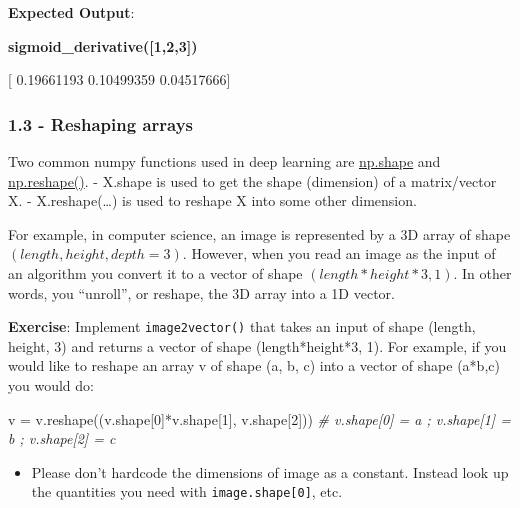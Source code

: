 \documentclass[11pt]{article}
\newenvironment{Shaded}{}{}
\newcommand{\DecValTok}[1]{\textcolor[rgb]{0.25,0.63,0.44}{{#1}}}
\newcommand{\CommentTok}[1]{\textcolor[rgb]{0.38,0.63,0.69}{\textit{{#1}}}}
\newcommand{\NormalTok}[1]{{#1}}
\begin{document}
    \textbf{Expected Output}:

\textbf{sigmoid\_derivative({[}1,2,3{]})}

{[} 0.19661193 0.10499359 0.04517666{]}

    \subsubsection{1.3 - Reshaping arrays}\label{reshaping-arrays}

Two common numpy functions used in deep learning are
\href{https://docs.scipy.org/doc/numpy/reference/generated/numpy.ndarray.shape.html}{np.shape}
and
\href{https://docs.scipy.org/doc/numpy/reference/generated/numpy.reshape.html}{np.reshape()}.
- X.shape is used to get the shape (dimension) of a matrix/vector X. -
X.reshape(\ldots{}) is used to reshape X into some other dimension.

For example, in computer science, an image is represented by a 3D array
of shape $(length, height, depth = 3)$. However, when you read an image
as the input of an algorithm you convert it to a vector of shape
$(length*height*3, 1)$. In other words, you ``unroll'', or reshape, the
3D array into a 1D vector.

\textbf{Exercise}: Implement \texttt{image2vector()} that takes an input
of shape (length, height, 3) and returns a vector of shape
(length*height*3, 1). For example, if you would like to reshape an array
v of shape (a, b, c) into a vector of shape (a*b,c) you would do:

\begin{Shaded}
\begin{Highlighting}[]
\NormalTok{v = v.reshape((v.shape[}\DecValTok{0}\NormalTok{]*v.shape[}\DecValTok{1}\NormalTok{], v.shape[}\DecValTok{2}\NormalTok{])) }\CommentTok{# v.shape[0] = a ; v.shape[1] = b ; v.shape[2] = c}
\end{Highlighting}
\end{Shaded}

\begin{itemize}
\itemsep1pt\parskip0pt
\item
  Please don't hardcode the dimensions of image as a constant. Instead
  look up the quantities you need with \texttt{image.shape{[}0{]}}, etc.
\end{itemize}
\end{document}
